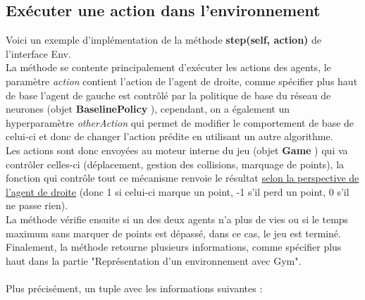 \documentclass[11pt, a4paper]{article}
\begin{document}
\subsection{\textbf{Exécuter une action dans l'environnement} }

\noindent Voici un exemple d'implémentation de la méthode \textbf{step(self, action)} de l'interface Env. \\ La méthode se contente principalement d'exécuter les actions des agents,
le paramètre \textit{action} contient l'action de l'agent de droite, comme spécifier plus haut de base l'agent de gauche est contrôlé par la politique de base du réseau de neurones (objet \textbf{BaselinePolicy} \cite{slimevolley.py}), 
cependant, on a également un hyperparamètre \textit{otherAction} qui permet de modifier le comportement de base de celui-ci et donc de changer l'action prédite en utilisant un autre algorithme.\\
Les actions sont donc envoyées au moteur interne du jeu (objet \textbf{Game} \cite{slimevolley.py}) qui va contrôler celles-ci (déplacement, gestion des collisions, marquage de points), la fonction qui contrôle
tout ce mécanisme renvoie le résultat \underline{selon la perspective de l'agent de droite} (donc 1 si celui-ci marque un point, -1 s'il perd un point, 0 s'il ne passe rien).\\
La méthode vérifie ensuite si un des deux agents n'a plus de vies ou si le temps maximum sans marquer de points est dépassé, dans ce cas, le jeu est terminé.\\
Finalement, la méthode retourne plusieurs informations, comme spécifier plus haut dans la partie "Représentation d'un environnement avec Gym".\\ \\
Plus précisément, un tuple avec les informations suivantes :
\end{document}
